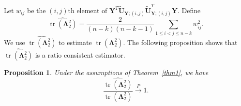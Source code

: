 \documentclass[12pt]{article} %
\DeclareMathOperator{\mytr}{tr}
\DeclareMathOperator{\mydiag}{diag}
\newcommand{\bZ}{\mathbf{Z}}
\newcommand{\bP}{\mathbf{P}}
\newcommand{\bY}{\mathbf{Y}}
\newcommand{\bU}{\mathbf{U}}
\newcommand{\bD}{\mathbf{D}}
\newcommand{\bV}{\mathbf{V}}
\newcommand{\bfsym}[1]{\ensuremath{\boldsymbol{#1}}}
\def\bLambda {\bfsym {\Lambda}}
\newtheorem{proposition}{Proposition}
\theoremstyle{definition}
\begin{document}
    Let $w_{ij}$ be the $(i,j)$th element of $\bY^T \tilde{\bU}_{\bY;(i,j)} \tilde{\bU}_{\bY;(i,j)}^T \bY$.
    Define
    $$
    \widehat{\mytr(\bLambda_2^2)}=\frac{2}{(n-k)(n-k-1)}\sum_{1\leq i<j\leq n-k}w_{ij}^2.
    $$
    We use $\widehat{\mytr(\bLambda_2^2)}$ to estimate $\mytr(\bLambda_2^2)$.
    The following proposition shows that $\widehat{\mytr(\bLambda_2^2)}$ is a ratio consistent estimator.
    \begin{proposition}\label{Taichangle}
        Under the assumptions of Theorem~\ref{thm1}, we have
        $$
        \frac{\widehat{\mytr(\bLambda^2_2)}}{\mytr(\bLambda^2_2)} \xrightarrow{P} 1.
        $$

    \end{proposition}


%
%
%
%
%
\end{document}
